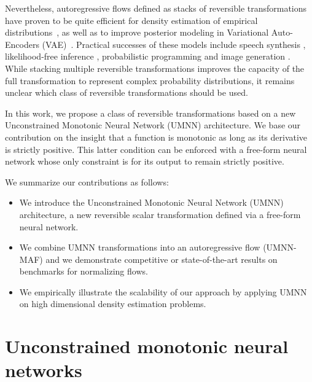 \documentclass{article}
\begin{document}
Nevertheless, autoregressive flows defined as stacks of reversible transformations have proven to be quite efficient for density estimation of empirical distributions~\citep{SNL, MAF, NAF}, as well as to improve posterior modeling in Variational Auto-Encoders (VAE)~\citep{MADE, IAF, NAF}.
Practical successes of these models include speech synthesis \citep{wavenet, parallel_wavenet}, likelihood-free inference \citep{SNL}, probabilistic programming \citep{pp} and image generation \citep{GLOW}.
While stacking multiple reversible transformations improves the capacity of the full transformation to represent complex probability distributions, it remains unclear which class of reversible transformations should be used.

In this work, we propose a class of reversible transformations based on a new Unconstrained Monotonic Neural Network (UMNN) architecture. We base our contribution on the insight that a function is monotonic as long as its derivative is strictly positive. This latter condition can be enforced with a free-form neural network whose only constraint is for its output to remain strictly positive.

We summarize our contributions as follows:
\begin{itemize}
    \item We introduce the Unconstrained Monotonic Neural Network (UMNN) architecture, a new reversible scalar transformation defined via a free-form neural network.
    \item We combine UMNN transformations into an autoregressive flow (UMNN-MAF) and we demonstrate competitive or state-of-the-art results on benchmarks for normalizing flows.
    \item We empirically illustrate the scalability of our approach by applying UMNN on high dimensional density estimation problems.
\end{itemize}



\section{Unconstrained monotonic neural networks}
\label{umnn}
\end{document}
